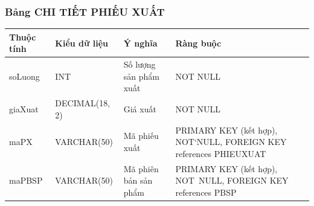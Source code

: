 \documentclass[a4paper,12pt]{report}
\begin{document}
\subsubsection{Bảng CHI TIẾT PHIẾU XUẤT}
\noindent
\begin{center}
    \begin{tabular}{|>{\centering\arraybackslash}p{3cm}|
        >{\centering\arraybackslash}p{4cm}|
        >{\centering\arraybackslash}p{4cm}|
        >{\centering\arraybackslash}p{4cm}|}
        \hline
        \textbf{Thuộc tính}                                                                                                               &
        \textbf{Kiểu dữ liệu}                                                                                                                             &
        \textbf{Ý nghĩa}                                                                                                 &
        \textbf{Ràng buộc}                                                                                                         \\
        \hline
        soLuong &  INT  & Số lượng sản phẩm xuất & NOT NULL \\
        \hline
        giaXuat &  DECIMAL(18, 2)  & Giá xuất & NOT NULL \\                                                                                                                          
        \hline
        maPX &  VARCHAR(50)  & Mã phiếu xuất & PRIMARY KEY (kết hợp), NOT`NULL, FOREIGN KEY references PHIEUXUAT \\
        \hline
        maPBSP & VARCHAR(50) & Mã phiên bản sản phẩm & PRIMARY KEY (kết hợp), NOT~NULL, FOREIGN KEY references PBSP \\                                                                                                                          
        \hline
    \end{tabular}
\end{center}
\end{document}
